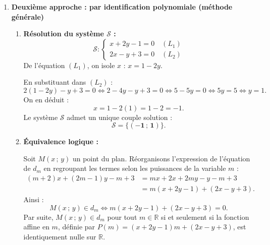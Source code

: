 \documentclass[11pt,a4paper]{article}
\newcommand{\R}{\mathbb{R}}
\begin{document}
\begin{correctionbox}
\begin{enumerate}
\begin{enumerate}
\begin{itemize}[leftmargin=*]
            \item \textbf{Condition suffisante (Existence) :}
            Vérifions si les coordonnées de $A(-1\,;\,1)$ satisfont l'équation de $d_m$ quel que soit le paramètre réel $m$ :
            Pour tout $m \in \R$ :
            \begin{align*}
            (m+2)x_A + (2m-1)y_A - m + 3 &= (m+2)(-1) + (2m-1)(1) - m + 3 \\
            &= -m - 2 + 2m - 1 - m + 3 \\
            &= (-m + 2m - m) + (-2 - 1 + 3) \\
            &= 0m + 0 = 0.
            \end{align*}
            Cette égalité étant vraie pour tout $m \in \R$, le point $A(-1\,;\,1)$ appartient bien à $d_m$ pour tout réel $m$.
        \end{itemize}
        \textbf{Conclusion :} $A(-1\,;\,1)$ est l'\textbf{unique} point appartenant à toutes les droites $d_m$ pour tout $m \in \R$.
    \end{enumerate}

    \item \textbf{Deuxième approche : par identification polynomiale (méthode générale)}
    \begin{enumerate}
        \item \textbf{Résolution du système $\mathscr{S}$ :}
        \[
        \mathscr{S} : \begin{cases}
        x + 2y - 1 = 0 \quad (L_1) \\
        2x - y + 3 = 0 \quad (L_2)
        \end{cases}
        \]
        De l'équation $(L_1)$, on isole $x$ : $x = 1 - 2y$.
        
        En substituant dans $(L_2)$ :
        \[
        2(1 - 2y) - y + 3 = 0 \iff 2 - 4y - y + 3 = 0 \iff 5 - 5y = 0 \iff 5y = 5 \iff y = 1.
        \]
        On en déduit :
        \[
        x = 1 - 2(1) = 1 - 2 = -1.
        \]
        Le système $\mathscr{S}$ admet un unique couple solution :
        \[
        \mathbf{\mathcal{S} = \{(-1\,;\,1)\}}.
        \]

        \item \textbf{Équivalence logique :}
        
        Soit $M(x\,;\,y)$ un point du plan. Réorganisons l'expression de l'équation de $d_m$ en regroupant les termes selon les puissances de la variable $m$ :
        \begin{align*}
        (m+2)x + (2m-1)y - m + 3 &= mx + 2x + 2my - y - m + 3 \\
        &= m(x + 2y - 1) + (2x - y + 3).
        \end{align*}
        Ainsi :
        \[
        M(x\,;\,y) \in d_m \iff m(x + 2y - 1) + (2x - y + 3) = 0.
        \]
        Par suite, $M(x\,;\,y) \in d_m$ pour tout $m \in \R$ si et seulement si la fonction affine en $m$, définie par $P(m) = (x + 2y - 1)m + (2x - y + 3)$, est identiquement nulle sur $\R$.
        

\end{enumerate}
\end{enumerate}
\end{correctionbox}
\end{document}
